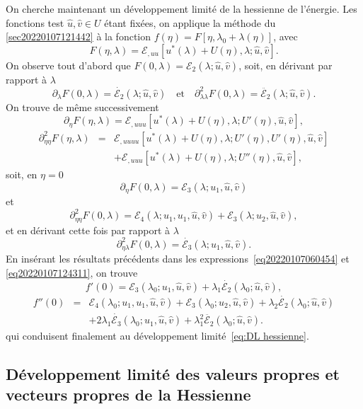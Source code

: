 \documentclass{article}
\begin{document}
On cherche maintenant un développement limité de la hessienne de
l'énergie. Les fonctions test $\hat{u}, \hat{v} \in U$ étant
fixées, on applique la méthode du
{\textsection}\ref{sec20220107121442} à la fonction $f (\eta) = F [\eta,
λ_0 + λ (\eta)]$, avec
\[ F (\eta, λ) =\mathcal{E}_{, u  u} [u^{\ast} (λ) + U
   (\eta), λ ; \hat{u}, \hat{v}] . \]
On observe tout d'abord que $F (0, λ) =\mathcal{E}_2 (λ ; \hat{u},
\hat{v})$, soit, en dérivant par rapport à $λ$
\[ \partial_{λ} F (0, λ) = \dot{\mathcal{E}_2} (λ ; \hat{u},
   \hat{v}) \quad \text{et} \quad \partial_{λ  λ}^2 F (0,
   λ) = \ddot{\mathcal{E}_2} (λ ; \hat{u}, \hat{v}) . \]
On trouve de même successivement
\[ \partial_{\eta} F (\eta, λ) =\mathcal{E}_{, u  u  u}
   [u^{\ast} (λ) + U (\eta), λ ; U' (\eta), \hat{u}, \hat{v}], \]
\begin{eqnarray}
  \partial_{\eta  \eta}^2 F (\eta, λ) & = & \mathcal{E}_{, u
   u  u  u} [u^{\ast} (λ) + U (\eta), λ ;
  U' (\eta), U' (\eta), \hat{u}, \hat{v}] \nonumber\\
  &  &  +\mathcal{E}_{, u  u  u} [u^{\ast} (λ)
  + U (\eta), λ ; U'' (\eta), \hat{u}, \hat{v}], \nonumber
\end{eqnarray}
soit, en $\eta = 0$
\[ \partial_{\eta} F (0, λ) =\mathcal{E}_3 (λ ; u_1, \hat{u},
   \hat{v}) \text{} \]
et
\[ \partial_{\eta  \eta}^2 F (0, λ) =\mathcal{E}_4 (λ ;
   u_1, u_1, \hat{u}, \hat{v}) +\mathcal{E}_3 (λ ; u_2, \hat{u},
   \hat{v}), \]
et en dérivant cette fois par rapport à $λ$
\[ \partial_{\eta  λ}^2 F (0, λ) = \dot{\mathcal{E}_3}
   (λ ; u_1, \hat{u}, \hat{v}) . \]
En insérant les résultats précédents dans les
expressions~\eqref{eq20220107060454} et \eqref{eq20220107124311}, on trouve
\[ f' (0) =\mathcal{E}_3 (λ_0 ; u_1, \hat{u}, \hat{v}) + λ_1
   \dot{\mathcal{E}_2} (λ_0 ; \hat{u}, \hat{v}), \]
\begin{eqnarray}
  f'' (0) & = & \mathcal{E}_4 (λ_0 ; u_1, u_1, \hat{u}, \hat{v})
  +\mathcal{E}_3 (λ_0 ; u_2, \hat{u}, \hat{v}) + λ_2
  \dot{\mathcal{E}_2} (λ_0 ; \hat{u}, \hat{v}) \nonumber\\
  &  &   + 2 λ_1  \dot{\mathcal{E}_3} (λ_0 ;
  u_1, \hat{u}, \hat{v}) + λ_1^2  \ddot{\mathcal{E}_2} (λ_0 ;
  \hat{u}, \hat{v}) . \nonumber
\end{eqnarray}
qui conduisent finalement au développement limité~\eqref{eq:DL
hessienne}.

\subsection{Développement limité des valeurs propres et vecteurs
propres de la Hessienne}
\end{document}
